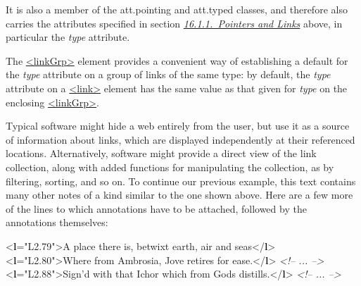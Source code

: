  It is also a member of the \textsf{att.pointing} and \textsf{att.typed} classes, and therefore also carries the attributes specified in section \textit{\hyperref[SAPTL]{16.1.1.\ Pointers and Links}} above, in particular the {\itshape type} attribute.\par
The \hyperref[TEI.linkGrp]{<linkGrp>} element provides a convenient way of establishing a default for the {\itshape type} attribute on a group of links of the same type: by default, the {\itshape type} attribute on a \hyperref[TEI.link]{<link>} element has the same value as that given for {\itshape type} on the enclosing \hyperref[TEI.linkGrp]{<linkGrp>}.\par
Typical software might hide a web entirely from the user, but use it as a source of information about links, which are displayed independently at their referenced locations. Alternatively, software might provide a direct view of the link collection, along with added functions for manipulating the collection, as by filtering, sorting, and so on. To continue our previous example, this text contains many other notes of a kind similar to the one shown above. Here are a few more of the lines to which annotations have to be attached, followed by the annotations themselves: \par\bgroup{}\exampleFont \begin{shaded}\noindent\mbox{}{<\textbf{l}\hspace*{1em}{xml:id}="{L2.79}">}A place there is, betwixt earth, air and seas{</\textbf{l}>}\mbox{}\newline 
{<\textbf{l}\hspace*{1em}{xml:id}="{L2.80}">}Where from Ambrosia, Jove retires for ease.{</\textbf{l}>}\mbox{}\newline 
\textit{<!-- ... -->}\mbox{}\newline 
{<\textbf{l}\hspace*{1em}{xml:id}="{L2.88}">}Sign'd with that Ichor which from Gods distills.{</\textbf{l}>}\mbox{}\newline 
\textit{<!-- ... -->}\mbox{}\newline 

\end{shaded}
